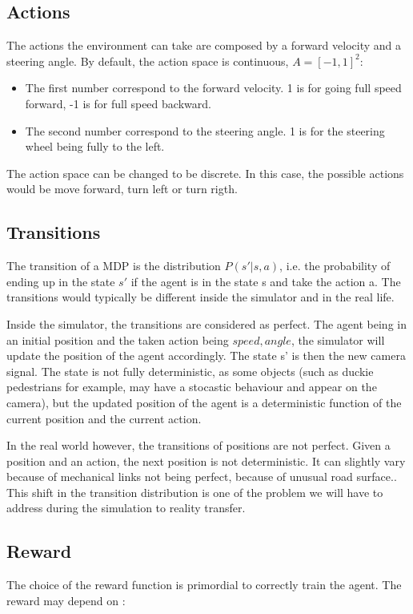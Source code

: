 \documentclass[12pt]{article}
\begin{document}
\subsection{Actions}
The actions the environment can take are composed by a forward velocity and a steering angle. By default, the action space is continuous, $A = [-1, 1]^2$:
\begin{itemize}
    \item The first number correspond to the forward velocity. 1 is for going full speed forward, -1 is for full speed backward.
    \item The second number correspond to the steering angle. 1 is for the steering wheel being fully to the left.
\end{itemize}

The action space can be changed to be discrete. In this case, the possible actions would be move forward, turn left or turn rigth.

\subsection{Transitions}
The transition of a MDP is the distribution $P(s'| s, a)$, i.e. the probability of ending up in the state $s'$ if the agent is in the state s and take the action a. The transitions would typically be different inside the simulator and in the real life.

Inside the simulator, the transitions are considered as perfect. The agent being in an initial position and the taken action being ${speed, angle}$, the simulator will update the position of the agent accordingly. The state s' is then the new camera signal. The state is not fully deterministic, as some objects (such as duckie pedestrians for example, may have a stocastic behaviour and appear on the camera), but the updated position of the agent is a deterministic function of the current
position and the current action.

In the real world however, the transitions of positions are not perfect. Given a position and an action, the next position is not deterministic. It can slightly vary because of mechanical links not being perfect, because of unusual road surface.. This shift in the transition distribution is one of the problem we will have to address during the simulation to reality transfer.

\subsection{Reward}
The choice of the reward function is primordial to correctly train the agent. The reward may depend on :
\end{document}
